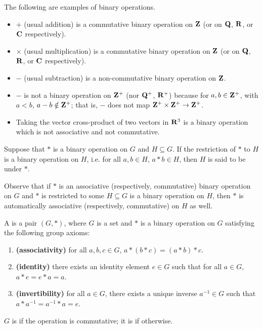 \begin{example}
The following are examples of binary operations.
\begin{itemize}
\item $+$ (usual addition) is a commutative binary operation on $\mathbf Z$ (or on $\mathbf Q$, $\mathbf R$, or $\mathbf C$ respectively).
\item $\times$ (usual multiplication) is a commutative binary operation on $\mathbf Z$ (or on $\mathbf Q$, $\mathbf R$, or $\mathbf C$ respectively).
\item $-$ (usual subtraction) is a non-commutative binary operation on $\mathbf Z$.
\item $-$ is not a binary operation on $\mathbf Z^+$ (nor $\mathbf Q^+$, $\mathbf R^+$) because for $a,b\in\mathbf Z^+$, with $a<b$, $a-b\notin\mathbf Z^+$; that is, $-$ does not map $\mathbf Z^+\times\mathbf Z^+\to\mathbf Z^+$.
\item Taking the vector cross-product of two vectors in $\mathbf R^3$ is a binary operation which is not associative and not commutative.
\end{itemize}
\end{example}

Suppose that $\ast$ is a binary operation on $G$ and $H\subseteq G$. If the restriction of $\ast$ to $H$ is a binary operation on $H$, i.e. for all $a,b\in H$, $a\ast b\in H$, then $H$ is said to be  under $\ast$.

\begin{remark}
Observe that if $\ast$ is an associative (respectively, commutative) binary operation on $G$ and $\ast$ is restricted to some $H\subseteq G$ is a binary operation on $H$, then $\ast$ is automatically associative (respectively, commutative) on $H$ as well.
\end{remark}

\begin{definition}[Group]
A  is a pair $(G,\ast)$, where $G$ is a set and $\ast$ is a binary operation on $G$ satisfying the following group axioms:
\begin{enumerate}[label=(\roman*)]
\item \textbf{(associativity)} for all $a,b,c \in G$, $a \ast (b \ast c)=(a \ast b) \ast c$.
\item \textbf{(identity)} there exists an identity element $e \in G$ such that for all $a\in G$, $a \ast e = e \ast a = a$.
\item \textbf{(invertibility)} for all $a \in G$, there exists a unique inverse $a^{-1} \in G$ such that $a \ast a^{-1} = a^{-1} \ast a = e$.
\end{enumerate}

$G$ is  if the operation is commutative; it is  if otherwise.
\end{definition}

